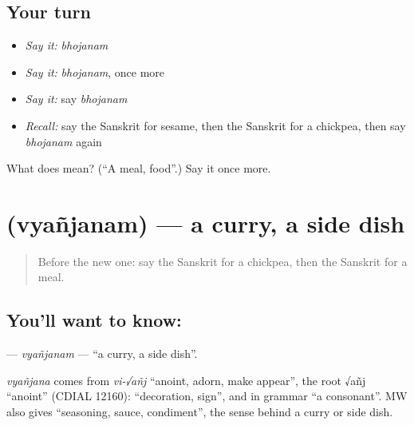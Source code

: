 \subsection*{Your turn}
\begin{itemize}
\raggedright
  \item \emph{Say it:} \emph{bhojanam}
  \item \emph{Say it:} \emph{bhojanam}, once more
  \item \emph{Say it:} say \emph{bhojanam}
  \item \emph{Recall:} say the Sanskrit for sesame, then the Sanskrit for a chickpea, then say \emph{bhojanam} again
\end{itemize}

\begin{tcolorbox}[breakable,colback=teal!4,colframe=teal!35!black,title={Before you move on}]
What does  mean? (\textquotedblleft{}A meal, food\textquotedblright{}.) Say it once more.
\end{tcolorbox}
\section[\texorpdfstring{\sk{व्यञ्जनम्} (vyañjanam)}{व्यञ्जनम् (vyañjanam)}]{ (vyañjanam) — a curry, a side dish}

\label{lesson:SA-C160-vyanjanam}



\begin{quote}
Before the new one: say the Sanskrit for a chickpea, then the Sanskrit for a meal.
\end{quote}

\subsection*{You'll want to know: }
\textbf{} — \emph{vyañjanam} — \textquotedblleft{}a curry, a side dish\textquotedblright{}.

\begin{cousinweb}
\emph{vyañjana} comes from \emph{vi-√añj} \textquotedblleft{}anoint, adorn, make appear\textquotedblright{}, the root √añj \textquotedblleft{}anoint\textquotedblright{} (CDIAL 12160): \textquotedblleft{}decoration, sign\textquotedblright{}, and in grammar \textquotedblleft{}a consonant\textquotedblright{}. MW also gives \textquotedblleft{}seasoning, sauce, condiment\textquotedblright{}, the sense behind a curry or side dish.
\end{cousinweb}

